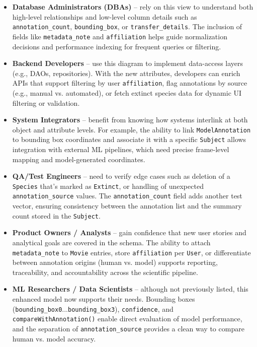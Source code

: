 \begin{itemize}
\item \textbf{Database Administrators (DBAs)} – rely on this view to understand both high-level relationships and low-level column details such as \texttt{annotation\_count}, \texttt{bounding\_box}, or \texttt{transfer\_details}. The inclusion of fields like \texttt{metadata\_note} and \texttt{affiliation} helps guide normalization decisions and performance indexing for frequent queries or filtering.
\item \textbf{Backend Developers} – use this diagram to implement data-access layers (e.g., DAOs, repositories). With the new attributes, developers can enrich APIs that support filtering by user \texttt{affiliation}, flag annotations by source (e.g., manual vs. automated), or fetch extinct species data for dynamic UI filtering or validation.
\item \textbf{System Integrators} – benefit from knowing how systems interlink at both object and attribute levels. For example, the ability to link \texttt{ModelAnnotation} to bounding box coordinates and associate it with a specific \texttt{Subject} allows integration with external ML pipelines, which need precise frame-level mapping and model-generated coordinates.
\item \textbf{QA/Test Engineers} – need to verify edge cases such as deletion of a \texttt{Species} that's marked as \texttt{Extinct}, or handling of unexpected \texttt{annotation\_source} values. The \texttt{annotation\_count} field adds another test vector, ensuring consistency between the annotation list and the summary count stored in the \texttt{Subject}.
\item \textbf{Product Owners / Analysts} – gain confidence that new user stories and analytical goals are covered in the schema. The ability to attach \texttt{metadata\_note} to \texttt{Movie} entries, store \texttt{affiliation} per \texttt{User}, or differentiate between annotation origins (human vs. model) supports reporting, traceability, and accountability across the scientific pipeline.
\item \textbf{ML Researchers / Data Scientists} – although not previously listed, this enhanced model now supports their needs. Bounding boxes (\texttt{bounding\_box0}...\texttt{bounding\_box3}), \texttt{confidence}, and \texttt{compareWithAnnotation()} enable direct evaluation of model performance, and the separation of \texttt{annotation\_source} provides a clean way to compare human vs. model accuracy.
\end{itemize}

